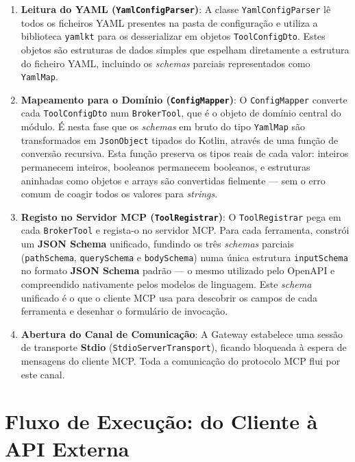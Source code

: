 \begin{enumerate}
    \item \textbf{Leitura do YAML (\texttt{YamlConfigParser})}: A classe \texttt{YamlConfigParser} lê todos os ficheiros YAML presentes na pasta de configuração e utiliza a biblioteca \texttt{yamlkt} para os desserializar em objetos \texttt{ToolConfigDto}. Estes objetos são estruturas de dados simples que espelham diretamente a estrutura do ficheiro YAML, incluindo os \textit{schemas} parciais representados como \texttt{YamlMap}.

    \item \textbf{Mapeamento para o Domínio (\texttt{ConfigMapper})}: O \texttt{ConfigMapper} converte cada \texttt{ToolConfigDto} num \texttt{BrokerTool}, que é o objeto de domínio central do módulo. É nesta fase que os \textit{schemas} em bruto do tipo \texttt{YamlMap} são transformados em \texttt{JsonObject} tipados do Kotlin, através de uma função de conversão recursiva. Esta função preserva os tipos reais de cada valor: inteiros permanecem inteiros, booleanos permanecem booleanos, e estruturas aninhadas como objetos e arrays são convertidas fielmente — sem o erro comum de coagir todos os valores para \textit{strings}.

    \item \textbf{Registo no Servidor MCP (\texttt{ToolRegistrar})}: O \texttt{ToolRegistrar} pega em cada \texttt{BrokerTool} e regista-o no servidor MCP. Para cada ferramenta, constrói um \textbf{JSON Schema} unificado, fundindo os três \textit{schemas} parciais (\texttt{pathSchema}, \texttt{querySchema} e \texttt{bodySchema}) numa única estrutura \texttt{inputSchema} no formato \textbf{JSON Schema} padrão — o mesmo utilizado pelo OpenAPI e compreendido nativamente pelos modelos de linguagem. Este \textit{schema} unificado é o que o cliente MCP usa para descobrir os campos de cada ferramenta e desenhar o formulário de invocação.

    \item \textbf{Abertura do Canal de Comunicação}: A Gateway estabelece uma sessão de transporte \textbf{Stdio} (\texttt{StdioServerTransport}), ficando bloqueada à espera de mensagens do cliente MCP. Toda a comunicação do protocolo MCP flui por este canal.
\end{enumerate}

\section{Fluxo de Execução: do Cliente à API Externa}

